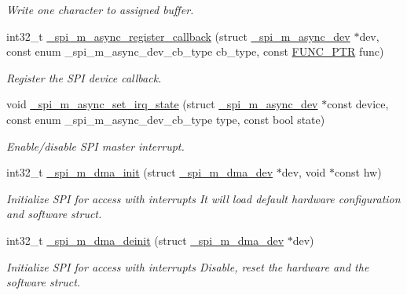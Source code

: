 \begin{DoxyCompactItemize}
\begin{DoxyCompactList}\small\item\em Write one character to assigned buffer. \end{DoxyCompactList}\item 
int32\+\_\+t \hyperlink{group__hpl__spi_ga8ded12d6ee42cc5265a9d5c43e042315}{\+\_\+spi\+\_\+m\+\_\+async\+\_\+register\+\_\+callback} (struct \hyperlink{group__hpl__spi_gaab37ebaab3686617eb20d5d175e82e6a}{\+\_\+spi\+\_\+m\+\_\+async\+\_\+dev} $\ast$dev, const enum \+\_\+spi\+\_\+m\+\_\+async\+\_\+dev\+\_\+cb\+\_\+type cb\+\_\+type, const \hyperlink{group__doc__driver__hal__utils__macro_gae40b38bc5f5a5bd452bdd59c67d9a9cf}{F\+U\+N\+C\+\_\+\+P\+TR} func)
\begin{DoxyCompactList}\small\item\em Register the S\+PI device callback. \end{DoxyCompactList}\item 
void \hyperlink{group__hpl__spi_ga78a45200688acd1d51a83fb1cbe013ec}{\+\_\+spi\+\_\+m\+\_\+async\+\_\+set\+\_\+irq\+\_\+state} (struct \hyperlink{group__hpl__spi_gaab37ebaab3686617eb20d5d175e82e6a}{\+\_\+spi\+\_\+m\+\_\+async\+\_\+dev} $\ast$const device, const enum \+\_\+spi\+\_\+m\+\_\+async\+\_\+dev\+\_\+cb\+\_\+type type, const bool state)
\begin{DoxyCompactList}\small\item\em Enable/disable S\+PI master interrupt. \end{DoxyCompactList}\item 
int32\+\_\+t \hyperlink{group__hpl__spi_ga6168cbfdef164f4980a99601f0ca4e6d}{\+\_\+spi\+\_\+m\+\_\+dma\+\_\+init} (struct \hyperlink{group__hpl__spi_ga63a73aeb4b9cc78590635e10bb0b1e8b}{\+\_\+spi\+\_\+m\+\_\+dma\+\_\+dev} $\ast$dev, void $\ast$const hw)
\begin{DoxyCompactList}\small\item\em Initialize S\+PI for access with interrupts It will load default hardware configuration and software struct. \end{DoxyCompactList}\item 
int32\+\_\+t \hyperlink{group__hpl__spi_gabcbacc2873e0fa5a00620ca13f376ddd}{\+\_\+spi\+\_\+m\+\_\+dma\+\_\+deinit} (struct \hyperlink{group__hpl__spi_ga63a73aeb4b9cc78590635e10bb0b1e8b}{\+\_\+spi\+\_\+m\+\_\+dma\+\_\+dev} $\ast$dev)
\begin{DoxyCompactList}\small\item\em Initialize S\+PI for access with interrupts Disable, reset the hardware and the software struct. \end{DoxyCompactList}\item 

\end{DoxyCompactItemize}
